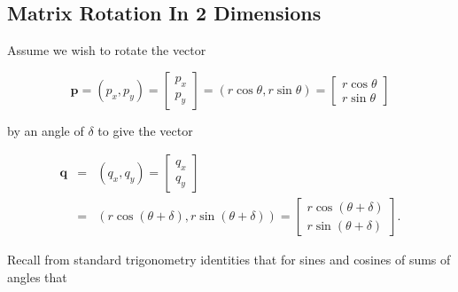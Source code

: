 \subsection{Matrix Rotation In 2 Dimensions}
\label{cdta0:srtr2:smrt2}

Assume we wish to rotate the vector

\begin{equation}
\label{eq:cdta0:srtr2:smrt2:01}
\mathbf{p} 
= (p_x, p_y) 
= \left[\begin{array}{c}p_x\\p_y\end{array}\right]
= (r \cos \theta, r \sin \theta) 
= \left[\begin{array}{c}r \cos \theta\\r \sin \theta\end{array}\right]
\end{equation}

\noindent{}by an angle of $\delta$ to give the vector

\begin{eqnarray}
\label{eq:cdta0:srtr2:smrt2:02}
\mathbf{q} & = & (q_x, q_y) = \left[\begin{array}{c}q_x\\q_y\end{array}\right] \\
\nonumber & = & (r \cos (\theta + \delta), r \sin (\theta + \delta)) 
= \left[\begin{array}{c}r \cos (\theta + \delta)\\r \sin (\theta+\delta)\end{array}\right].
\end{eqnarray}

\noindent{}Recall from standard trigonometry identities that for sines and cosines of 
sums of angles that

